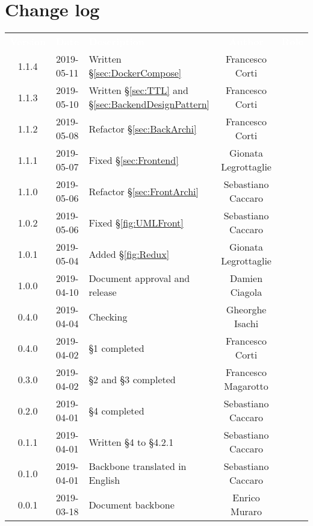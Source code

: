 \section*{Change log}
{
	\renewcommand{\arraystretch}{1.5}
	\centering
	\begin{longtable}{ c c C{6cm} c c }
		\textcolor{white}{\textbf{Version}} & \textcolor{white}{\textbf{Date}} & \textcolor{white}{\textbf{Description}} & \textcolor{white}{\textbf{Author}} & \textcolor{white}{\textbf{Role}}\\
		1.1.4 & 2019-05-11 & Written §\ref{sec:DockerCompose} & Francesco Corti & \reda{}\\
		1.1.3 & 2019-05-10 & Written §\ref{sec:TTL} and §\ref{sec:BackendDesignPattern} & Francesco Corti & \reda{}\\
		1.1.2 & 2019-05-08 & Refactor §\ref{sec:BackArchi}  & Francesco Corti & \reda{}\\
		1.1.1 & 2019-05-07 & Fixed §\ref{sec:Frontend} & Gionata Legrottaglie & \reda{}\\
		1.1.0 & 2019-05-06 & Refactor §\ref{sec:FrontArchi} & Sebastiano Caccaro & \reda{}\\
		1.0.2 & 2019-05-06 & Fixed §\ref{fig:UMLFront} & Sebastiano Caccaro & \reda{}\\
		1.0.1 & 2019-05-04 & Added §\ref{fig:Redux} & Gionata Legrottaglie & \reda{}\\
		1.0.0 & 2019-04-10 & Document approval and release & Damien Ciagola & \RdP{}\\
		0.4.0 & 2019-04-04 & Checking & Gheorghe Isachi & \ver{}\\
		0.4.0 & 2019-04-02 & §1 completed  & Francesco Corti & \reda{}\\		
		0.3.0 & 2019-04-02 & §2 and §3 completed  & Francesco Magarotto & \reda{}\\				
		0.2.0 & 2019-04-01 & §4 completed  & Sebastiano Caccaro & \reda{}\\
		0.1.1 & 2019-04-01 & Written §4 to §4.2.1  & Sebastiano Caccaro & \reda{}\\
		0.1.0 & 2019-04-01 & Backbone translated in English & Sebastiano Caccaro & \reda{}\\
		0.0.1 & 2019-03-18 & Document backbone & Enrico Muraro & \reda{}\\
		
	\end{longtable}

}

